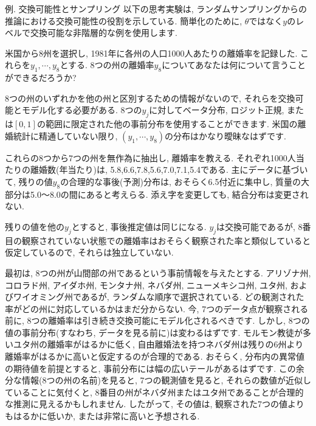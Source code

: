 \documentclass[10pt,dvipdfmx,a4]{beamer}
\begin{document}

\begin{frame}{例. 交換可能性とサンプリング}
以下の思考実験は, ランダムサンプリングからの推論における交換可能性の役割を示している.
簡単化のために, $\theta$ではなく$y$のレベルで交換可能な非階層的な例を使用します.

米国から8州を選択し, 1981年に各州の人口1000人あたりの離婚率を記録した.
これらを$y_1, \cdots, y_8$とする.
8つの州の離婚率$y_8$についてあなたは何について言うことができるだろうか?

8つの州のいずれかを他の州と区別するための情報がないので, それらを交換可能とモデル化する必要がある.
8つの$y_j$に対してベータ分布, ロジット正規, または$[0, 1]$の範囲に限定された他の事前分布を使用することができます.
米国の離婚統計に精通していない限り, $(y_1,\cdots,y_8)$の分布はかなり曖昧なはずです.

これらの8つから7つの州を無作為に抽出し, 離婚率を教える.
それぞれ1000人当たりの離婚数(年当たり)は, 5.8,6.6,7.8,5.6,7.0,7.1,5.4である.
主にデータに基づいて, 残りの値$y_8$の合理的な事後(予測)分布は, おそらく6.5付近に集中し, 質量の大部分は5.0～8.0の間にあると考えらる.
添え字を変更しても, 結合分布は変更されない.
\end{frame}


\begin{frame}
残りの値を他の$y_j$とすると, 事後推定値は同じになる.
$y_j$は交換可能であるが, 8番目の観察されていない状態での離婚率はおそらく観察された率と類似していると仮定しているので, それらは独立していない.

最初は, 8つの州が山間部の州であるという事前情報を与えたとする.
アリゾナ州, コロラド州, アイダホ州, モンタナ州, ネバダ州, ニューメキシコ州, ユタ州, およびワイオミング州であるが, ランダムな順序で選択されている.
どの観測された率がどの州に対応しているかはまだ分からない.
今, 7つのデータ点が観察される前に, 8つの離婚率は引き続き交換可能にモデル化されるべきです.
しかし, 8つの値の事前分布(すなわち, データを見る前に)は変わるはずです.
モルモン教徒が多いユタ州の離婚率がはるかに低く, 自由離婚法を持つネバダ州は残りの6州より離婚率がはるかに高いと仮定するのが合理的である.
おそらく, 分布内の異常値の期待値を前提とすると, 事前分布には幅の広いテールがあるはずです.
この余分な情報(8つの州の名前)を見ると, 7つの観測値を見ると, それらの数値が近似していることに気付くと, 8番目の州がネバダ州またはユタ州であることが合理的な推測に見えるかもしれません.
したがって, その値は, 観察された7つの値よりもはるかに低いか, または非常に高いと予想される.
\end{frame}
\end{document}
